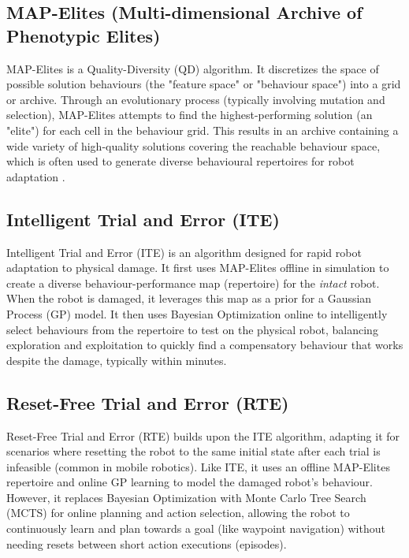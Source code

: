 \documentclass[12pt, a4paper]{article} %
\begin{document}
\subsection{MAP-Elites (Multi-dimensional Archive of Phenotypic Elites)}
\label{def:mapelites} %

MAP-Elites \citep{mouret2015illuminating} is a Quality-Diversity (QD) algorithm. It discretizes the space of possible solution behaviours (the "feature space" or "behaviour space") into a grid or archive. Through an evolutionary process (typically involving mutation and selection), MAP-Elites attempts to find the highest-performing solution (an "elite") for each cell in the behaviour grid. This results in an archive containing a wide variety of high-quality solutions covering the reachable behaviour space, which is often used to generate diverse behavioural repertoires for robot adaptation \citep{cully2015robots, chatzilygeroudis2018reset, allard2023online}.

\subsection{Intelligent Trial and Error (ITE)}
\label{def:ite} %

Intelligent Trial and Error (ITE) \citep{cully2015robots} is an algorithm designed for rapid robot adaptation to physical damage. It first uses MAP-Elites offline in simulation to create a diverse behaviour-performance map (repertoire) for the \textit{intact} robot. When the robot is damaged, it leverages this map as a prior for a Gaussian Process (GP) model. It then uses Bayesian Optimization online to intelligently select behaviours from the repertoire to test on the physical robot, balancing exploration and exploitation to quickly find a compensatory behaviour that works despite the damage, typically within minutes.

\subsection{Reset-Free Trial and Error (RTE)}
\label{def:rte} %

Reset-Free Trial and Error (RTE) \citep{chatzilygeroudis2018reset} builds upon the ITE algorithm, adapting it for scenarios where resetting the robot to the same initial state after each trial is infeasible (common in mobile robotics). Like ITE, it uses an offline MAP-Elites repertoire and online GP learning to model the damaged robot's behaviour. However, it replaces Bayesian Optimization with Monte Carlo Tree Search (MCTS) for online planning and action selection, allowing the robot to continuously learn and plan towards a goal (like waypoint navigation) without needing resets between short action executions (episodes).
\end{document}
